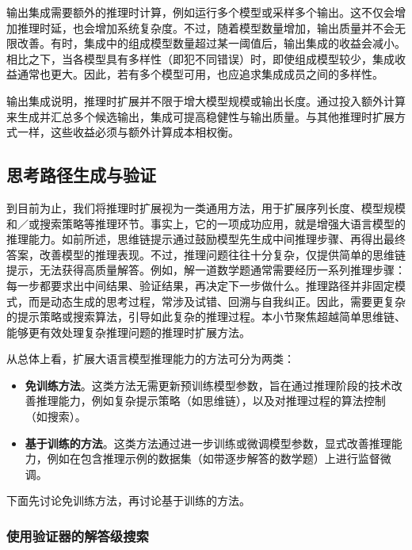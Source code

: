 输出集成需要额外的推理时计算，例如运行多个模型或采样多个输出。这不仅会增加推理时延，也会增加系统复杂度。不过，随着模型数量增加，输出质量并不会无限改善。有时，集成中的组成模型数量超过某一阈值后，输出集成的收益会减小。相比之下，当各模型具有多样性（即犯不同错误）时，即使组成模型较少，集成收益通常也更大。因此，若有多个模型可用，也应追求集成成员之间的多样性。

输出集成说明，推理时扩展并不限于增大模型规模或输出长度。通过投入额外计算来生成并汇总多个候选输出，集成可提高稳健性与输出质量。与其他推理时扩展方式一样，这些收益必须与额外计算成本相权衡。

\subsection{思考路径生成与验证}
\label{sec:generating-long-thinking-paths}

到目前为止，我们将推理时扩展视为一类通用方法，用于扩展序列长度、模型规模和／或搜索策略等推理环节。事实上，它的一项成功应用，就是增强大语言模型的推理能力。如前所述，思维链提示通过鼓励模型先生成中间推理步骤、再得出最终答案，改善模型的推理表现。不过，推理问题往往十分复杂，仅提供简单的思维链提示，无法获得高质量解答。例如，解一道数学题通常需要经历一系列推理步骤：每一步都要求出中间结果、验证结果，再决定下一步做什么。推理路径并非固定模式，而是动态生成的思考过程，常涉及试错、回溯与自我纠正。因此，需要更复杂的提示策略或搜索算法，引导如此复杂的推理过程。本小节聚焦超越简单思维链、能够更有效处理复杂推理问题的推理时扩展方法。

从总体上看，扩展大语言模型推理能力的方法可分为两类：

\begin{itemize}
\item \vspace{0.5em} \textbf{免训练方法}。这类方法无需更新预训练模型参数，旨在通过推理阶段的技术改善推理能力，例如复杂提示策略（如思维链），以及对推理过程的算法控制（如搜索）。
\item \vspace{0.3em} \textbf{基于训练的方法}。这类方法通过进一步训练或微调模型参数，显式改善推理能力，例如在包含推理示例的数据集（如带逐步解答的数学题）上进行监督微调。
\end{itemize}
\vspace{0.5em}

下面先讨论免训练方法，再讨论基于训练的方法。

\subsubsection{使用验证器的解答级搜索}

